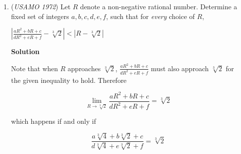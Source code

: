 \begin{enumerate}
 Finally, to reach an $a$ state, we can select a $5$ from a $b$ state and select an even number from a $c$ state. We can also reach $a_n$ from $a_{n-1}$ because of the fact that once the product is divisible by $10$, it will always be divisible by $10$ regardless of the following selections. Thus its formula is $a_n=a_{n-1}+\frac{1}{9}b_{n-1}+\frac{4}{9}c_{n-1}$.

 For our formula for $b_n$, we can substitute to find that $b_n=\frac{8}{9}b_{n-1}+\left(\frac{4}{9}\right)^n$. Solving this recursion yields $b_n=\left(\frac{8}{9}\right)^n-\left(\frac{4}{9}\right)^n$.

 For our formula for $c_n$, we can substitute to find that $c_n=\frac{5}{9}c_{n-1}+\frac{1}{9}\cdot\left(\frac{4}{9}\right)^{n-1}$. Solving this recursion yields $c_n=\left(\frac{5}{9}\right)^n-\left(\frac{4}{9}\right)^n$.

 Finally, substituting the values into the $a_n$ formula yields $a_n=a_{n-1}+\frac{1}{9}\left(\left(\frac{8}{9}\right)^{n-1}+4\cdot\left(\frac{5}{9}\right)^{n-1}-5\cdot\left(\frac{4}{9}\right)^{n-1}\right)$. Solving this recursion yields the final answer, $\boxed{1-\left(\frac{8}{9}\right)^n-\left(\frac{5}{9}\right)^n+\left(\frac{4}{9}\right)^n}$.

 <i>Alternate solutions are always welcome. If you have a different, elegant solution to this problem, please \href{https://artofproblemsolving.com/wiki/index.php?title=1972\_USAMO\_Problems/Problem\_3&action=edit}{add it} to this page.</i>



	\item (\textit{USAMO 1972}) Let $R$ denote a non-negative rational number. Determine a fixed set of integers $a,b,c,d,e,f$, such that for \textit{every} choice of $R$, 


 $\left|\frac{aR^2+bR+c}{dR^2+eR+f}-\sqrt[3]{2}\right|<|R-\sqrt[3]{2}|$




\textbf{Solution}

Note that when $R$ approaches $\sqrt[3]{2}$, $\frac{aR^2+bR+c}{dR^2+eR+f}$ must also approach $\sqrt[3]{2}$ for the given inequality to hold. Therefore

 
 \[\lim_{R\rightarrow \sqrt[3]{2}} \frac{aR^2+bR+c}{dR^2+eR+f}=\sqrt[3]{2}\]

 which happens if and only if

 
 \[\frac{a\sqrt[3]{4}+b\sqrt[3]{2}+c}{d\sqrt[3]{4}+e\sqrt[3]{2}+f}=\sqrt[3]{2}\]


\end{enumerate}
